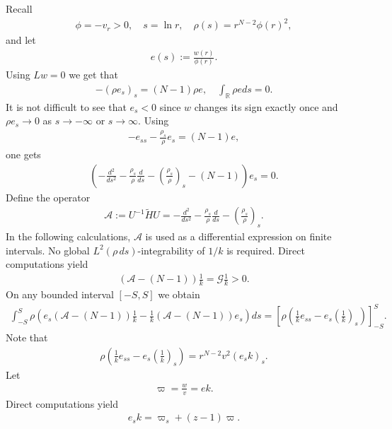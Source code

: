 \documentclass{article}
\theoremstyle{definition} \theoremstyle{remark}
\numberwithin{equation}{section}
\newcommand{\R}{\mathbb{R}}
\newcommand{\G}{\mathcal{G}}
\begin{document}
		Recall
	\begin{align*}
		\phi = -v_r > 0, \quad s = \ln r, \quad \rho(s) = r^{N-2}\phi(r)^2,
	\end{align*}
	and let
	\begin{align*}
		e(s) := \frac{w(r)}{\phi(r)}.
	\end{align*}
	Using $Lw = 0$ we get that
	\begin{align*}
		-\left(\rho e_s\right)_s = (N-1)\rho e, \quad \int_{\R}\rho eds = 0.
	\end{align*}
	It is not difficult to see that $e_s < 0$ since $w$ changes its sign exactly once and $\rho e_s \to 0$ as $s \to -\infty$ or $s \to \infty$. Using
	\begin{align*}
		-e_{ss} - \frac{\rho_s}{\rho}e_s = (N-1)e,
	\end{align*}
	one gets
	\begin{align} \label{eigenfunctionzs}
		\left(-\frac{d^2}{ds^2} - \frac{\rho_s}{\rho}\frac{d}{ds} - \left(\frac{\rho_s}{\rho}\right)_s - (N-1)\right)e_s = 0.
	\end{align}
	Define the operator
	\begin{align*}
		\mathcal{A} := U^{-1}\widetilde{H}U = -\frac{d^2}{ds^2} - \frac{\rho_s}{\rho}\frac{d}{ds} - \left(\frac{\rho_s}{\rho}\right)_s.
	\end{align*}
	In the following calculations, $\mathcal A$ is used as a differential expression on finite intervals. No global $L^2(\rho\,ds)$-integrability of $1/k$ is required.
	Direct computations yield
	\begin{align} \label{testing1k>0}
		\left(\mathcal{A} - (N-1)\right)\frac{1}{k} = \G\frac{1}{k} > 0.
	\end{align}
On any bounded interval $[-S,S]$ we obtain
	\begin{align} \label{-StoS}
		\int_{-S}^S \rho\left(e_s(\mathcal{A} - (N-1))\frac{1}{k} - \frac{1}{k}(\mathcal{A} - (N-1))e_s\right)ds  = \left[\rho \left(\frac{1}{k}e_{ss} - e_s\left(\frac{1}{k}\right)_s\right)\right]_{-S}^S.
	\end{align}
	Note that
	\begin{align*}
		\rho \left(\frac{1}{k}e_{ss} - e_s\left(\frac{1}{k}\right)_s\right) = r^{N-2}v^2\left(e_s k\right)_s.
	\end{align*}
	Let
	\begin{align*}
		\varpi = \frac{w}{v} = e k.
	\end{align*}
	Direct computations yield
	\begin{align*}
		e_s k = \varpi_s + (z-1)\varpi.
	\end{align*}
\end{document}
